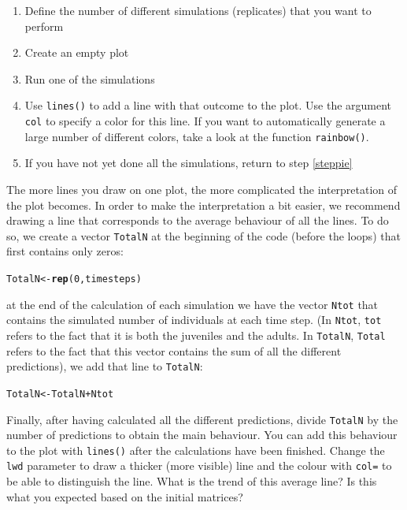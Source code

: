 \documentclass{article}\usepackage[]{graphicx}\usepackage[]{color}
\makeatletter
\newcommand{\hlnum}[1]{\textcolor[rgb]{0.686,0.059,0.569}{#1}}%
\newcommand{\hlopt}[1]{\textcolor[rgb]{0,0,0}{#1}}%
\newcommand{\hlstd}[1]{\textcolor[rgb]{0.345,0.345,0.345}{#1}}%
\newcommand{\hlkwb}[1]{\textcolor[rgb]{0.69,0.353,0.396}{#1}}%
\newcommand{\hlkwd}[1]{\textcolor[rgb]{0.737,0.353,0.396}{\textbf{#1}}}%
\newenvironment{kframe}{%
 \def\at@end@of@kframe{}%
 \ifinner\ifhmode%
  \def\at@end@of@kframe{\end{minipage}}%
  \begin{minipage}{\columnwidth}%
 \fi\fi%
 \def\FrameCommand##1{\hskip\@totalleftmargin \hskip-\fboxsep
 \colorbox{shadecolor}{##1}\hskip-\fboxsep
     \hskip-\linewidth \hskip-\@totalleftmargin \hskip\columnwidth}%
 \MakeFramed {\advance\hsize-\width
   \@totalleftmargin\z@ \linewidth\hsize
   \@setminipage}}%
 {\par\unskip\endMakeFramed%
 \at@end@of@kframe}
\newenvironment{knitrout}{}{} %
\makeatother
\begin{document}
\begin{enumerate}
\item Define the number of different simulations (replicates) that you want to perform
\item Create an empty plot
\item Run one of the simulations\label{steppie}
\item Use \texttt{lines()} to add a line with that outcome to the plot. Use the argument \texttt{col} to specify a color for this line. If you want to automatically generate a large number of different colors, take a look at the function \texttt{rainbow()}.
\item If you have not yet done all the simulations, return to step \ref{steppie}
\end{enumerate}
The more lines you draw on one plot, the more complicated the interpretation of the plot becomes. In order to make the interpretation a bit easier, we recommend drawing a line that corresponds to the average behaviour of all the lines. To do so, we create a vector \texttt{TotalN} at the beginning of the code (before the loops) that first contains only zeros:
\begin{knitrout}
\color{fgcolor}\begin{kframe}
\begin{alltt}
\hlstd{TotalN}\hlkwb{<-}\hlkwd{rep}\hlstd{(}\hlnum{0}\hlstd{,timesteps)}
\end{alltt}
\end{kframe}
\end{knitrout}
at the end of the calculation of each simulation we have the vector \texttt{Ntot} that contains the simulated number of individuals at each time step. (In \texttt{Ntot}, \texttt{tot} refers to the fact that it is both the juveniles and the adults. In \texttt{TotalN}, \texttt{Total} refers to the fact that this vector contains the sum of all the different predictions), we add that line to \texttt{TotalN}:
\begin{knitrout}
\color{fgcolor}\begin{kframe}
\begin{alltt}
\hlstd{TotalN}\hlkwb{<-}\hlstd{TotalN}\hlopt{+}\hlstd{Ntot}
\end{alltt}
\end{kframe}
\end{knitrout}
Finally, after having calculated all the different predictions, divide \texttt{TotalN} by the number of predictions to obtain the main behaviour. You can add this behaviour to the plot with \texttt{lines()} after the calculations have been finished. Change the \texttt{lwd} parameter to draw a thicker (more visible) line and the colour with \texttt{col=} to be able to distinguish the line. What is the trend of this average line? Is this what you expected based on the initial matrices? 
\end{document}
